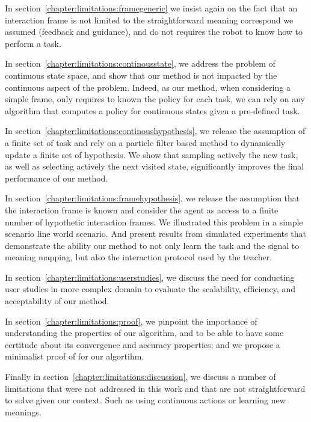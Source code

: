 In section~\ref{chapter:limitations:framegeneric} we insist again on the fact that an interaction frame is not limited to the straightforward meaning correspond we assumed (feedback and guidance), and do not requires the robot to know how to perform a task.

In section~\ref{chapter:limitations:continousstate}, we address the problem of continuous state space, and show that our method is not impacted by the continuous aspect of the problem. Indeed, as our method, when considering a simple frame, only requires to known the policy for each task, we can rely on any algorithm that computes a policy for continuous states given a pre-defined task.

In section~\ref{chapter:limitations:continoushypothesis}, we release the assumption of a finite set of task and rely on a particle filter based method to dynamically update a finite set of hypothesis. We show that sampling actively the new task, as well as selecting actively the next visited state, significantly improves the final performance of our method.

In section~\ref{chapter:limitations:framehypothesis}, we release the assumption that the interaction frame is known and consider the agent as access to a finite number of hypothetic interaction frames. We illustrated this problem in a simple scenario line world scenario. And present results from simulated experiments that demonstrate the ability our method to not only learn the task and the signal to meaning mapping, but also the interaction protocol used by the teacher.

In section~\ref{chapter:limitations:userstudies}, we discuss the need for conducting user studies in more complex domain to evaluate the scalability, efficiency, and acceptability of our method.

In section~\ref{chapter:limitations:proof}, we pinpoint the importance of understanding the properties of our algorithm, and to be able to have some certitude about its convergence and accuracy properties; and we propose a minimalist proof of for our algortihm.

Finally in section~\ref{chapter:limitations:discussion}, we discuss a number of limitations that were not addressed in this work and that are not straightforward to solve given our context. Such as using continuous actions or learning new meanings.

% 
% 
% 
% 
% 
% 
% 
% 
% 

